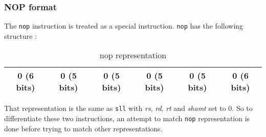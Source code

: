 \subsubsection*{NOP format}

	The \verb?nop? instruction is treated as a special instruction. \verb?nop? has the following structure : 
	\begin{table}[H]
	\centering
	\begin{tabular}{|c|c|c|c|c|c|}
	\hline 
	0 (6 bits) & 0 (5 bits) & 0 (5 bits) & 0 (5 bits) & 0 (5 bits) & 0 (6 bits) \\ 
	\hline 
	\end{tabular} 
	\caption{nop representation}
	\end{table}
	
	That representation is the same as \verb?sll? with \textit{rs}, \textit{rd}, \textit{rt} and \textit{shamt} set to 0. So to differentiate these two instructions, an attempt to match \verb?nop? representation is done before trying to match other representations.
